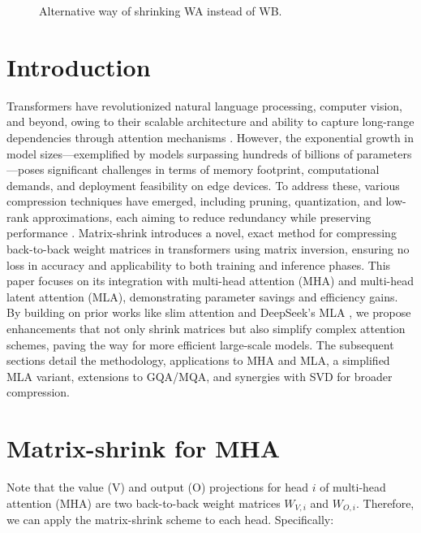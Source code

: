\documentclass{article}
\begin{document}
\begin{figure}[h]
\centering
\caption{Alternative way of shrinking WA instead of WB.}
\label{fig:fig2}
\end{figure}

\section{Introduction}
Transformers have revolutionized natural language processing, computer vision, and beyond, owing to their scalable architecture and ability to capture long-range dependencies through attention mechanisms \cite{vaswani2017attention}. However, the exponential growth in model sizes---exemplified by models surpassing hundreds of billions of parameters---poses significant challenges in terms of memory footprint, computational demands, and deployment feasibility on edge devices. To address these, various compression techniques have emerged, including pruning, quantization, and low-rank approximations, each aiming to reduce redundancy while preserving performance \cite{arxiv2023survey}. Matrix-shrink introduces a novel, exact method for compressing back-to-back weight matrices in transformers using matrix inversion, ensuring no loss in accuracy and applicability to both training and inference phases. This paper focuses on its integration with multi-head attention (MHA) and multi-head latent attention (MLA), demonstrating parameter savings and efficiency gains. By building on prior works like slim attention \cite{graef2025slim} and DeepSeek's MLA \cite{deepseek2024}, we propose enhancements that not only shrink matrices but also simplify complex attention schemes, paving the way for more efficient large-scale models. The subsequent sections detail the methodology, applications to MHA and MLA, a simplified MLA variant, extensions to GQA/MQA, and synergies with SVD for broader compression.

\section{Matrix-shrink for MHA}
Note that the value (V) and output (O) projections for head $i$ of multi-head attention (MHA) are two back-to-back weight matrices $W_{V,i}$ and $W_{O,i}$. Therefore, we can apply the matrix-shrink scheme to each head. Specifically:
\end{document}

